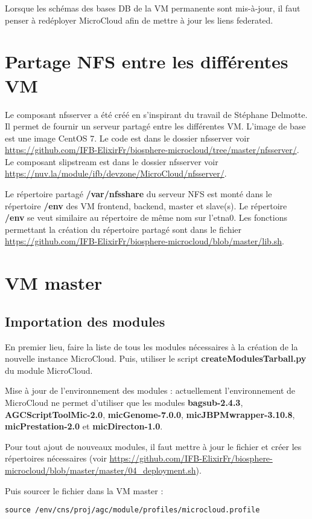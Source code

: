 \begin{mycolorbox}
	Lorsque les schémas des bases DB de la VM permanente sont mis-à-jour, il faut penser à redéployer MicroCloud afin de mettre à jour les liens federated.
\end{mycolorbox}

\section{Partage NFS entre les différentes VM}

\label{nfsserver} Le composant nfsserver a été créé en s'inspirant du travail de Stéphane Delmotte.
Il permet de fournir un serveur partagé entre les différentes VM.
L'image de base est une image CentOS 7.
Le code est dans le dossier nfsserver voir  \url{https://github.com/IFB-ElixirFr/biosphere-microcloud/tree/master/nfsserver/}.
Le composant slipstream est dans le dossier nfsserver voir
\url{https://nuv.la/module/ifb/devzone/MicroCloud/nfsserver/}.

Le répertoire partagé \textbf{/var/nfsshare} du serveur NFS est monté dans le répertoire \textbf{/env}
des VM frontend, backend, master et slave(s).
Le répertoire \textbf{/env} se veut similaire au répertoire de même nom sur l’etna0. 
Les fonctions permettant la création du répertoire partagé sont dans le fichier \url{https://github.com/IFB-ElixirFr/biosphere-microcloud/blob/master/lib.sh}.

\section{VM master}

\subsection{Importation des modules}
En premier lieu, faire la liste de tous les modules nécessaires à la création de la nouvelle instance MicroCloud.
Puis, utiliser le script \textbf{createModulesTarball.py} du module MicroCloud.

Mise à jour de l'environnement des modules :
actuellement l'environnement de MicroCloud ne permet d'utiliser que les modules \textbf{bagsub-2.4.3}, \textbf{AGCScriptToolMic-2.0}, \textbf{micGenome-7.0.0}, \textbf{micJBPMwrapper-3.10.8}, \textbf{micPrestation-2.0} et \textbf{micDirecton-1.0}.
\newline

\begin{mycolorbox}
	Pour tout ajout de nouveaux modules, il faut mettre à jour le fichier  et créer les répertoires nécessaires (voir \url{https://github.com/IFB-ElixirFr/biosphere-microcloud/blob/master/master/04_deployment.sh}).
\end{mycolorbox}

Puis sourcer le fichier  dans la VM master :
\begin{lstlisting}[style=bash]
source /env/cns/proj/agc/module/profiles/microcloud.profile
\end{lstlisting}

